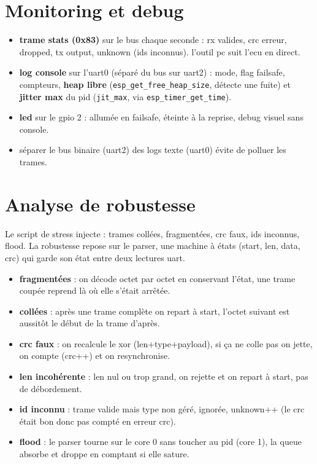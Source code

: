 \documentclass[a4paper,11pt]{article}
\begin{document}
\section{Monitoring et debug}

\begin{itemize}
    \item \textbf{trame stats (0x83)} sur le bus chaque seconde : rx valides, crc
    erreur, dropped, tx output, unknown (ids inconnus). l'outil pc suit l'ecu en direct.
    \item \textbf{log console} sur l'uart0 (séparé du bus sur uart2) : mode, flag
    failsafe, compteurs, \textbf{heap libre} (\texttt{esp\_get\_free\_heap\_size},
    détecte une fuite) et \textbf{jitter max} du pid (\texttt{jit\_max}, via
    \texttt{esp\_timer\_get\_time}).
    \item \textbf{led} sur le gpio 2 : allumée en failsafe, éteinte à la reprise,
    debug visuel sans console.
    \item séparer le bus binaire (uart2) des logs texte (uart0) évite de polluer
    les trames.
\end{itemize}

\section{Analyse de robustesse}

Le script de stress injecte : trames collées, fragmentées, crc faux, ids inconnus,
flood. La robustesse repose sur le parser, une machine à états
(start, len, data, crc) qui garde son état entre deux lectures uart.

\begin{itemize}
    \item \textbf{fragmentées} : on décode octet par octet en conservant l'état,
    une trame coupée reprend là où elle s'était arrêtée.
    \item \textbf{collées} : après une trame complète on repart à start, l'octet
    suivant est aussitôt le début de la trame d'après.
    \item \textbf{crc faux} : on recalcule le xor (len+type+payload), si ça ne
    colle pas on jette, on compte (crc++) et on resynchronise.
    \item \textbf{len incohérente} : len nul ou trop grand, on rejette et on
    repart à start, pas de débordement.
    \item \textbf{id inconnu} : trame valide mais type non géré, ignorée, unknown++
    (le crc était bon donc pas compté en erreur crc).
    \item \textbf{flood} : le parser tourne sur le core 0 sans toucher au pid
    (core 1), la queue absorbe et droppe en comptant si elle sature.
\end{itemize}
\end{document}
